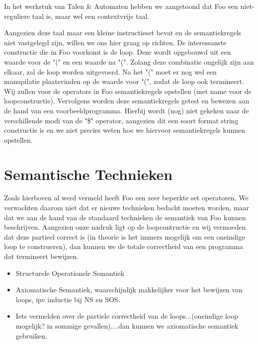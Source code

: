 \documentclass[11pt]{article}
\begin{document}
In het werkstuk van Talen \& Automaten hebben we aangetoond dat Foo een niet-reguliere taal is, maar wel een contextvrije taal.

Aangezien deze taal maar een kleine instructieset bevat en de semantiekregels niet vastgelegd zijn, willen we ons hier graag op richten.
De interessanste constructie die in Foo voorkomt is de loop.
Deze wordt opgebouwd uit een waarde voor de "(" en een waarde na "(".
Zolang deze combinatie ongelijk zijn aan elkaar, zal de loop worden uitgevoerd. Na het "(" moet er nog wel een manupilatie plaatsvinden op de waarde voor "(", zodat de loop ook termineert.
Wij zullen voor de operators in Foo semantiekregels opstellen (met name voor de loopconstructie). Vervolgens worden deze semantiekregels getest en bewezen aan de hand van een voorbeeldprogramma.
Hierbij wordt (nog) niet gekeken naar de verschillende modi van de "\$" operator, aangezien dit een soort format string constructie is en we niet precies weten hoe we hiervoor semantiekregels kunnen opstellen. %




\section{Semantische Technieken}

Zoals hierboven al werd vermeld heeft Foo een zeer beperkte set operatoren.
We verwachten daarom niet dat er nieuwe technieken bedacht moeten worden, maar dat we aan de hand van de standaard technieken de semantiek van Foo kunnen beschrijven.
Aangezien onze nadruk ligt op de loopcontructie en wij vermoeden dat deze partieel correct is (in theorie is het immers mogelijk om een oneindige loop te construeren), dan kunnen we de totale correctheid van een programma dat termineert bewijzen.

\begin{itemize}
\item Structurele Operationele Semantiek
\item Axiomatische Semantiek, waarschijnlijk makkelijker voor het bewijzen van loops, ipv inductie bij NS en SOS.
\item Iets vermelden over de partiele correctheid van de loops...(oneindige loop mogelijk? in sommige gevallen)....dan kunnen we axiomatische semantiek gebruiken.
\end{itemize}
\end{document}
